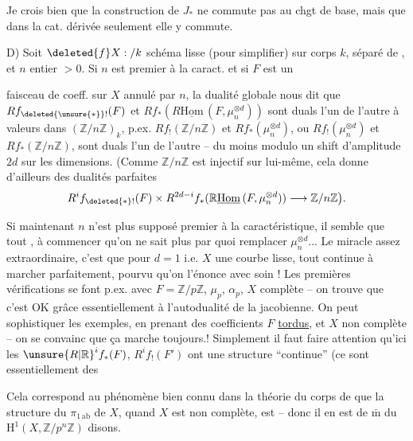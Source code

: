 Je crois bien que la construction de $J_*$ ne commute pas au chgt de base, mais que dans la cat. dérivée seulement elle y commute.

D) Soit $\deleted{f}X:/k$ schéma lisse  (pour simplifier) sur corps $k$, séparé de ,  et $n$ entier $>0$. Si $n$ est premier à la caract. et si $F$ est un

faisceau de coeff. sur $X$ annulé par $n$, la dualité globale nous dit que $Rf_{\deleted{\unsure{*}}!}(F)$ et $Rf_*(R\underline{\mathrm{Hom}}\,(F,\mu_n^{\otimes d}))$ sont duals l'un de l'autre à valeurs dans $(\mathbb{Z}/n\mathbb{Z})_k$, p.ex. $Rf_!(\mathbb{Z}/n\mathbb{Z})$ et $Rf_*(\mu_n^{\otimes d})$, ou $Rf_!(\mu_n^{\otimes d})$ et $Rf_*(\mathbb{Z}/n\mathbb{Z})$, sont duals l'un de l'autre -- du moins modulo un shift d'amplitude $2d$ sur les dimensions. (Comme $\mathbb{Z}/n\mathbb{Z}$ est injectif sur lui-même, cela donne d'ailleurs des dualités parfaites
\[
R^{i}f_{\deleted{*}!}(F)\times R^{2d-i}f_*(\mathbb{R}\underline{\mathrm{Hom}}\,(F,\mu_n^{\otimes d}))\longrightarrow\mathbb{Z}/n\mathbb{Z}\big{)}.
\]

Si maintenant $n$ n'est plus supposé premier à la caractéristique,  il semble que tout , à commencer qu'on ne sait plus  par quoi remplacer $\mu_n^{\otimes d}$... Le miracle assez extraordinaire, c'est que pour $d=1$ i.e. $X$ une courbe lisse, tout continue à marcher parfaitement, pourvu qu'on l'énonce avec soin ! Les premières vérifications se font p.ex. avec $F=\mathbb{Z}/p\mathbb{Z}$, $\mu_p$, $\alpha_p$, $X$ complète -- on trouve que c'est OK grâce essentiellement à l'autodualité de la jacobienne. On peut sophistiquer les exemples, en prenant des coefficients $F$ \uline{tordus}, et $X$ non complète -- on se convainc que ça marche toujours.! Simplement il faut faire attention qu'ici les ${\unsure{R|\mathbb{R}}}^if_*(F)$, $R^if_!(F')$ ont une structure ``continue'' (ce sont essentiellement des  

Cela correspond au phénomène bien connu dans la théorie du corps de  que la structure du $\pi_{1\,\mathrm{ab}}$ de $X$, quand $X$ est non complète, est \uline{} -- donc il en est de $\bar{\mathrm m}$ du $\mathrm{H}^{1}(X,\mathbb{Z}/p^{n}\mathbb{Z})$ disons.

